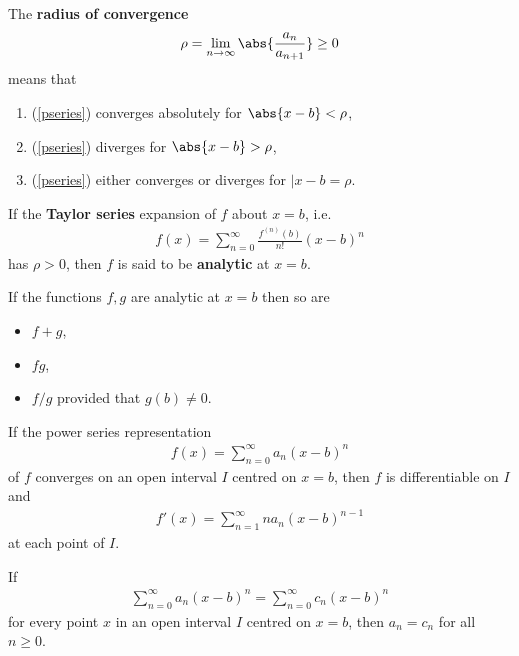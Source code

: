 \documentclass{article}
\begin{document}
\begin{definition}
    The \textbf{radius of convergence}
    \begin{align*}
        \rho=\lim_{n\to\infty}\abs{\frac{a_n}{a_{n+1}}}\geq 0
    \end{align*}
    means that
    \begin{enumerate}
        \item (\ref{pseries}) converges absolutely for $\abs{x-b}<\rho$,
        \item (\ref{pseries}) diverges for $\abs{x-b}>\rho$,
        \item (\ref{pseries}) either converges or diverges for $|x-b=\rho$.
    \end{enumerate}
\end{definition}
\begin{definition}
    If the \textbf{Taylor series} expansion of $f$ about $x=b$, i.e.
    \begin{align*}
        f(x)=\sum_{n=0}^\infty \frac{f^{(n)}(b)}{n!}(x-b)^n
    \end{align*}
    has $\rho>0$, then $f$ is said to be \textbf{analytic} at $x=b$.
\end{definition}
\begin{lemma}
    If the functions $f,g$ are analytic at $x=b$ then so are
    \begin{itemize}
        \item $f+g$,
        \item $fg$,
        \item $f/g$ provided that $g(b)\not=0$.
    \end{itemize}
\end{lemma}
\begin{theorem}
    If the power series representation
    \begin{align*}
        f(x)=\sum_{n=0}^\infty a_n(x-b)^n
    \end{align*}
    of $f$ converges on an open interval $I$ centred on $x=b$, then $f$
    is differentiable on $I$ and
    \begin{align*}
        f'(x)=\sum_{n=1}^\infty na_n(x-b)^{n-1}
    \end{align*}
    at each point of $I$.
\end{theorem}
\begin{theorem}
    If
    \begin{align*}
        \sum_{n=0}^\infty a_n(x-b)^n = \sum_{n=0}^\infty c_n(x-b)^n
    \end{align*}
    for every point $x$ in an open interval $I$ centred on $x=b$, then $a_n=c_n$
    for all $n\geq 0$.
\end{theorem}
\end{document}
